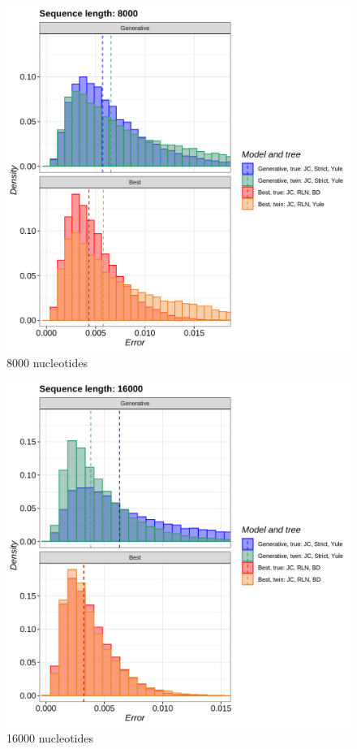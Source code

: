 \begin{figure}[H]
  \includegraphics[width=\textwidth]{pirouette_example_21/errors_8000.png}
  \caption{8000 nucleotides}
\end{figure}

\begin{figure}[H]
  \includegraphics[width=\textwidth]{pirouette_example_21/errors_16000.png}
  \caption{16000 nucleotides}
\end{figure}

